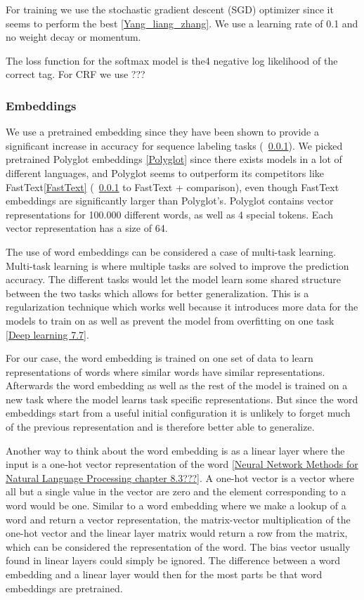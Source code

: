 For training we use the stochastic gradient descent (SGD) optimizer since it
seems to perform the best \ref{Yang_liang_zhang}. We use a learning rate of 0.1
and no weight decay or momentum.

The loss function for the softmax model is the4 negative log likelihood of the
correct tag. For CRF we use ???


\subsubsection{Embeddings}

We use a pretrained embedding since they have been shown to provide a
significant increase in accuracy for sequence labeling tasks (~\ref{}). We
picked pretrained Polyglot embeddings \ref{Polyglot} since there exists models
in a lot of different languages, and Polyglot seems to outperform its
competitors like FastText\ref{FastText} (~\ref{} to FastText + comparison), even
though FastText embeddings are significantly larger than Polyglot's. Polyglot
contains vector representations for 100.000 different words, as well as 4
special tokens. Each vector representation has a size of 64.

The use of word embeddings can be considered a case of multi-task learning.
Multi-task learning is where multiple tasks are solved to improve the prediction
accuracy. The different tasks would let the model learn some shared structure
between the two tasks which allows for better generalization. This is a
regularization technique which works well because it introduces more data for
the models to train on as well as prevent the model from overfitting on one task
\ref{Deep learning 7.7}. 

For our case, the word embedding is trained on one set of data to learn
representations of words where similar words have similar representations.
Afterwards the word embedding as well as the rest of the model is trained on a
new task where the model learns task specific representations. But since the
word embeddings start from a useful initial configuration it is unlikely to
forget much of the previous representation and is therefore better able to
generalize.

Another way to think about the word embedding is as a linear layer where the
input is a one-hot vector representation of the word \ref{Neural Network Methods
for Natural Language Processing chapter 8.3???}. A one-hot vector is a vector
where all but a single value in the vector are zero and the element
corresponding to a word would be one. Similar to a word embedding where we make
a lookup of a word and return a vector representation, the matrix-vector
multiplication of the one-hot vector and the linear layer matrix would return a
row from the matrix, which can be considered the representation of the word. The
bias vector usually found in linear layers could simply be ignored. The
difference between a word embedding and a linear layer would then for the most
parts be that word embeddings are pretrained.


